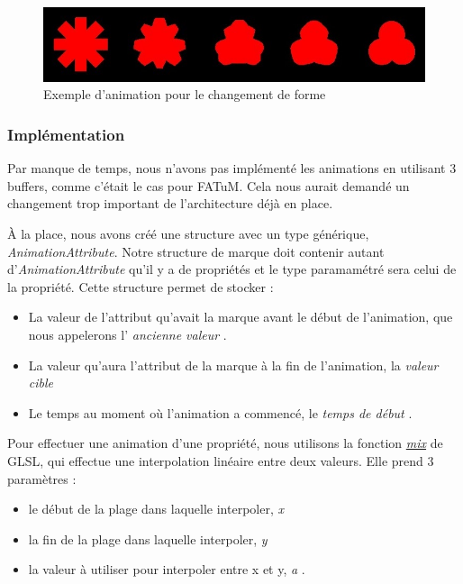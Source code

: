 \documentclass[12pt]{article}
\begin{document}
\begin{figure}[htp]
  \centering
  \includegraphics[scale=0.8]{images/anim-exemple}
  \caption{Exemple d'animation pour le changement de forme}
  \label{fig:anim-ex}
\end{figure}

\subsubsection{Implémentation}

Par manque de temps, nous n'avons pas implémenté les animations en utilisant 3 buffers, comme c'était le
cas pour FATuM. Cela nous aurait demandé un changement trop important de l'architecture déjà en place.

À la place, nous avons créé une structure avec un type générique, \textit{AnimationAttribute}.
Notre structure de marque doit contenir autant d'\textit{AnimationAttribute} qu'il y a de propriétés et le
type paramamétré sera celui de la propriété.
Cette structure permet de stocker :
\begin{itemize}
\item La valeur de l'attribut qu'avait la marque avant le début de l'animation, que nous appelerons l'\og
\textit{ancienne valeur} \fg.
\item La valeur qu'aura l'attribut de la marque à la fin de l'animation, la \og \textit{valeur cible} \fg
\item Le temps au moment où l'animation a commencé, le \og \textit{temps de début} \fg.
\end{itemize}

Pour effectuer une animation d'une propriété, nous utilisons la fonction
\textit{\href{https://www.khronos.org/registry/OpenGL-Refpages/gl4/html/mix.xhtml}{mix}} de GLSL, qui effectue une
interpolation linéaire entre deux valeurs.
Elle prend 3 paramètres :
\begin{itemize}
\item le début de la plage dans laquelle interpoler, \og \textit{x} \fg
\item la fin de la plage dans laquelle interpoler, \og \textit{y} \fg
\item la valeur à utiliser pour interpoler entre x et y, \og \textit{a} \fg.
\end{itemize}
\end{document}
